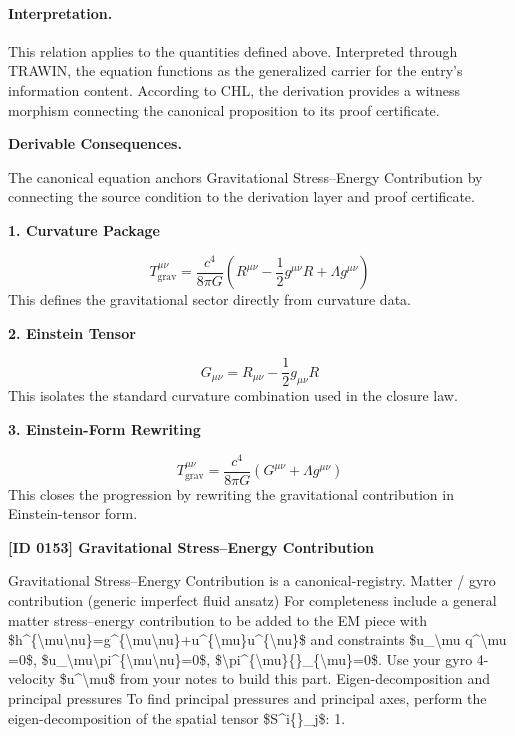\paragraph{Interpretation.}
This relation applies to the quantities defined above. Interpreted through TRAWIN, the equation functions as the generalized carrier for the entry’s information content. According to CHL, the derivation provides a witness morphism connecting the canonical proposition to its proof certificate.

\par\vspace{0.35em}
\noindent\textbf{Derivable Consequences.}\quad
\begingroup
\footnotesize
\raggedright
The canonical equation anchors Gravitational Stress--Energy Contribution by connecting the source condition to the derivation layer and proof certificate.
\par\endgroup

\noindent\textbf{1. Curvature Package}\par
\[
T_{\mathrm{grav}}^{\mu\nu}
=
\frac{c^4}{8\pi G}
\left(
R^{\mu\nu}-\frac{1}{2}g^{\mu\nu}R+\Lambda g^{\mu\nu}
\right)
\]
\noindent This defines the gravitational sector directly from curvature data.\par
\noindent\textbf{2. Einstein Tensor}\par
\[
G_{\mu\nu}=R_{\mu\nu}-\frac{1}{2}g_{\mu\nu}R
\]
\noindent This isolates the standard curvature combination used in the closure law.\par
\noindent\textbf{3. Einstein-Form Rewriting}\par
\[
T_{\mathrm{grav}}^{\mu\nu}
=
\frac{c^4}{8\pi G}
\left(
G^{\mu\nu}+\Lambda g^{\mu\nu}
\right)
\]
\noindent This closes the progression by rewriting the gravitational contribution in Einstein-tensor form.\par

\clearpage
\noindent\textbf{[ID 0153] Gravitational Stress--Energy Contribution}\par
\vspace{0.35em}
\begingroup\small
{}
Gravitational Stress--Energy Contribution is a canonical-registry. Matter / gyro contribution (generic imperfect fluid ansatz) For completeness include a general matter stress--energy contribution to be added to the EM piece with \$h\textasciicircum{}\{\textbackslash{}mu\textbackslash{}nu\}=g\textasciicircum{}\{\textbackslash{}mu\textbackslash{}nu\}+u\textasciicircum{}\{\textbackslash{}mu\}u\textasciicircum{}\{\textbackslash{}nu\}\$ and constraints \$u\_\textbackslash{}mu q\textasciicircum{}\textbackslash{}mu =0\$, \$u\_\textbackslash{}mu\textbackslash{}pi\textasciicircum{}\{\textbackslash{}mu\textbackslash{}nu\}=0\$, \$\textbackslash{}pi\textasciicircum{}\{\textbackslash{}mu\}\{\}\_\{\textbackslash{}mu\}=0\$. Use your gyro 4-velocity \$u\textasciicircum{}\textbackslash{}mu\$ from your notes to build this part. Eigen-decomposition and principal pressures To find principal pressures and principal axes, perform the eigen-decomposition of the spatial tensor \$S\textasciicircum{}i\{\}\_j\$: 1.


